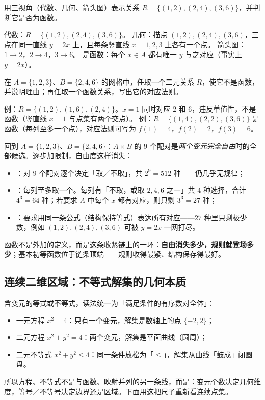 \begin{explore}
\begin{example}
用三视角（代数、几何、箭头图）表示关系 $R=\{(1,2),(2,4),(3,6)\}$，并判断它是否为函数。
\end{example}
\begin{solution}
代数：$R=\{(1,2),(2,4),(3,6)\}$。
几何：描点 $(1,2),(2,4),(3,6)$，三点在同一直线 $y=2x$ 上，且每条竖直线 $x=1,2,3$ 上各有一个点。
箭头图：$1\to2$，$2\to4$，$3\to6$。
是函数：每个 $x\in A$ 都有唯一 $y$ 与之对应（事实上 $y=2x$）。
\end{solution}

\begin{problem}
在 $A=\{1,2,3\}$、$B=\{2,4,6\}$ 的网格中，任取一个二元关系 $R$，使它不是函数，并说明理由；再任取一个函数关系，写出它的对应法则。
\end{problem}
\begin{solution}
例：$R=\{(1,2),(1,6),(2,4)\}$。$x=1$ 同时对应 $2$ 和 $6$，违反单值性，不是函数（竖直线 $x=1$ 与点集有两个交点）。
例：$R=\{(1,4),(2,2),(3,6)\}$ 是函数（每列至多一个点），对应法则可写为 $f(1)=4$，$f(2)=2$，$f(3)=6$。
\end{solution}


回到 $A=\{1,2,3\}$、$B=\{2,4,6\}$：$A\times B$ 的 $9$ 个配对是\emph{两个变元完全自由}时的全部候选。逐步加限制，自由度这样消失：
\begin{itemize}
  \item {}：对 $9$ 个配对逐个决定「取／不取」，共 $2^9=512$ 种——仍几乎无规律；
  \item {}：每列至多取一个。每列有「不取，或取 $2,4,6$ 之一」共 $4$ 种选择，合计 $4^3=64$ 种；若要求 $A$ 中每个 $x$ 都有对应，则只剩 $3^3=27$ 种；
  \item {}：要求用同一条公式（结构保持等式）表达所有对应——$27$ 种里只剩极少数，例如 $(1,2),(2,4),(3,6)$ 可被 $y=2x$ 一网打尽。
\end{itemize}
函数不是外加的定义，而是这条收紧链上的一环：\textbf{自由消失多少，规则就登场多少}；基本初等函数位于链条顶端——规则收得最紧、结构保存得最好。

\subsection{连续二维区域：不等式解集的几何本质}


含变元的等式或不等式，读法统一为「满足条件的有序数对全体」：
\begin{itemize}
  \item 一元方程 $x^2=4$：只有一个变元，解集是数轴上的点 $\{-2,2\}$；
  \item 二元方程 $x^2+y^2=4$：两个变元，解集是平面曲线（圆周）；
  \item 二元不等式 $x^2+y^2\leq4$：同一条件放松为「$\leq$」，解集从曲线「鼓成」闭圆盘。
\end{itemize}
所以方程、不等式不是与函数、映射并列的另一条线，而是：变元个数决定几何维度，等号／不等号决定边界还是区域。下面用这把尺子重新看连续点集。


\end{explore}
